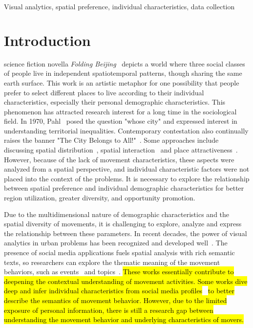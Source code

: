\documentclass{ieeeaccess}
\begin{document}
\begin{keywords}
Visual analytics, spatial preference, individual characteristics, data collection
\end{keywords}

\titlepgskip=-15pt

\maketitle

\section{Introduction}
\label{sec:introduction}
 science fiction novella \textit{Folding Beijing}~\cite{hao2016_foldingbeijing} depicts a world where three social classes of people live in independent spatiotemporal patterns, though sharing the same earth surface. This work is an artistic metaphor for one possibility that people prefer to select different places to live according to their individual characteristics, especially their personal demographic characteristics. This phenomenon has attracted research interest for a long time in the sociological field. In 1970, Pahl~\cite{pahl1975whose} posed the question "whose city" and expressed interest in understanding territorial inequalities. Contemporary contestation also continually raises the banner "The City Belongs to All!"~\cite{Mayer2017_whosecity}. Some approaches include discussing spatial distribution~\cite{RN909}, spatial interaction~\cite{RN1692} and place attractiveness~\cite{retailcity}. However, because of the lack of movement characteristics, these aspects were analyzed from a spatial perspective, and individual characteristic factors were not placed into the context of the problems. It is necessary to explore the relationship between spatial preference and individual demographic characteristics for better region utilization, greater diversity, and opportunity promotion.

Due to the multidimensional nature of demographic characteristics and the spatial diversity of movements, it is challenging to explore, analyze and express the relationship between these parameters. In recent decades, the power of visual analytics in urban problems has been recognized and developed well~\cite{wang2013visual, zeng2013visualizing}. The presence of social media applications fuels spatial analysis with rich semantic texts, so researchers can explore the thematic meaning of the movement behaviors, such as events~\cite{chen2017map} and topics~\cite{bosch2013scatterblogs2}. \hl{These works essentially contribute to deepening the contextual understanding of movement activities. Some works dive deep and infer individual characteristics from social media profiles}~\cite{peddinti2014internet} \hl{to better describe the semantics of movement behavior. However, due to the limited exposure of personal information, there is still a research gap between understanding the movement behavior and underlying characteristics of movers.}
\end{document}
